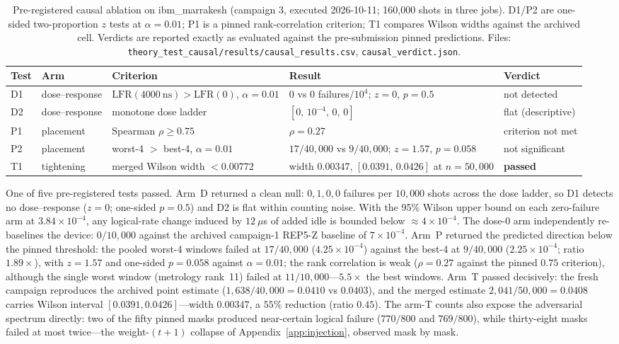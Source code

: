 \documentclass[pdflatex,sn-mathphys-num]{sn-jnl}
\theoremstyle{thmstyleone}
\theoremstyle{thmstyletwo}
\theoremstyle{thmstylethree}
\begin{document}
\begin{table}[htbp]\centering\small
\caption{Pre-registered causal ablation on ibm\_marrakesh (campaign 3, executed 2026-10-11; 160{,}000 shots in three jobs). D1/P2 are one-sided two-proportion $z$ tests at $\alpha=0.01$; P1 is a pinned rank-correlation criterion; T1 compares Wilson widths against the archived cell. Verdicts are reported exactly as evaluated against the pre-submission pinned predictions. Files: \texttt{theory\_test\_causal/results/causal\_results.csv}, \texttt{causal\_verdict.json}.}
\label{tab:causal}
\begin{tabular}{@{}lllll@{}}
\toprule
Test & Arm & Criterion & Result & Verdict \\
\midrule
D1 & dose--response & $\mathrm{LFR}(4000~\mathrm{ns})>\mathrm{LFR}(0)$, $\alpha=0.01$ & $0$ vs $0$ failures$/10^{4}$; $z=0$, $p=0.5$ & not detected \\
D2 & dose--response & monotone dose ladder & $[0,\,10^{-4},\,0,\,0]$ & flat (descriptive) \\
P1 & placement & Spearman $\rho\ge0.75$ & $\rho=0.27$ & criterion not met \\
P2 & placement & worst-4 $>$ best-4, $\alpha=0.01$ & $17/40{,}000$ vs $9/40{,}000$; $z=1.57$, $p=0.058$ & not significant \\
T1 & tightening & merged Wilson width $<0.00772$ & width $0.00347$, $[0.0391,\,0.0426]$ at $n=50{,}000$ & \textbf{passed} \\
\bottomrule
\end{tabular}
\end{table}

One of five pre-registered tests passed. Arm~D returned a clean null: $0,1,0,0$ failures per $10{,}000$ shots across the dose ladder, so D1 detects no dose--response ($z=0$; one-sided $p=0.5$) and D2 is flat within counting noise. With the 95\% Wilson upper bound on each zero-failure arm at $3.84\times10^{-4}$, any logical-rate change induced by $12~\mu$s of added idle is bounded below $\approx$$4\times10^{-4}$. The dose-0 arm independently re-baselines the device: $0/10{,}000$ against the archived campaign-1 REP5-Z baseline of $7\times10^{-4}$. Arm~P returned the predicted direction below the pinned threshold: the pooled worst-4 windows failed at $17/40{,}000$ ($4.25\times10^{-4}$) against the best-4 at $9/40{,}000$ ($2.25\times10^{-4}$; ratio $1.89\times$), with $z=1.57$ and one-sided $p=0.058$ against $\alpha=0.01$; the rank correlation is weak ($\rho=0.27$ against the pinned $0.75$ criterion), although the single worst window (metrology rank~11) failed at $11/10{,}000$---$5.5\times$ the best windows. Arm~T passed decisively: the fresh campaign reproduces the archived point estimate ($1{,}638/40{,}000=0.0410$ vs $0.0403$), and the merged estimate $2{,}041/50{,}000=0.0408$ carries Wilson interval $[0.0391,0.0426]$---width $0.00347$, a $55\%$ reduction (ratio $0.45$). The arm-T counts also expose the adversarial spectrum directly: two of the fifty pinned masks produced near-certain logical failure ($770/800$ and $769/800$), while thirty-eight masks failed at most twice---the weight-$(t{+}1)$ collapse of Appendix~\ref{app:injection}, observed mask by mask.
\end{document}
